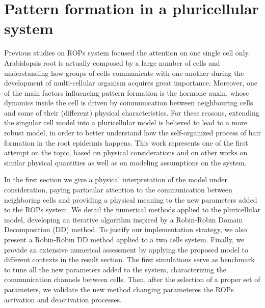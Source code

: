\chapter{Pattern formation in a pluricellular system}\label{cap:3}
 Previous studies on ROPs system focused the attention on one single cell only. Arabidopsis root is actually composed by a large number of cells and understanding how groups of cells communicate with one another during the development of multi-cellular organism acquires great importance. Moreover, one of the main factors influencing pattern formation is the hormone auxin, whose dynamics inside the cell is driven by communication between neighbouring cells and some of their (different) physical characteristics. For these reasons, extending the singular cell model into a pluricellular model is believed to lead to a more robust model, in order to better understand how the self-organized process of hair formation in the root epidermis happens. This work represents one of the first attempt on the topic, based on physical considerations and on other works on similar physical quantities as well as on modeling assumptions on the system.

 In the first section we give a physical interpretation of the model under consideration, paying particular attention to the communication between neighboring cells and providing a physical meaning to the new parameters added to the ROPs system. We detail the numerical methods applied to the pluricellular model, developing an iterative algorithm inspired by a Robin-Robin Domain Decomposition (DD) method. To justify our implementation strategy, we also present a Robin-Robin DD method applied to a two cells system. Finally, we provide an extensive numerical assessment by applying the proposed model to different contexts in the result section. The first simulations serve as benchmark to tune all the new parameters added to the system, characterizing the communication channels between cells. Then, after the selection of a proper set of parameters, we validate the new method changing parameteres the ROPs activation and deactivation processes.

